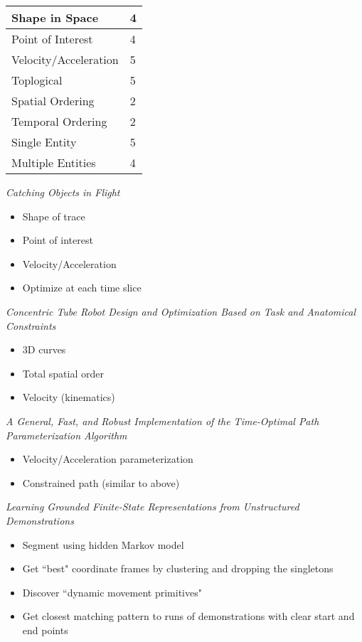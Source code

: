 \documentclass[12pt]{article}
\begin{document}
\begin{table}[h]
\begin{tabular}{|l|l|}
\hline
Shape in Space &  4\\ \hline
Point of Interest & 4  \\ \hline
Velocity/Acceleration & 5 \\ \hline
Toplogical & 5 \\ \hline
Spatial Ordering & 2 \\ \hline
Temporal Ordering & 2 \\ \hline
Single Entity & 5 \\ \hline
Multiple Entities & 4 \\ \hline
\end{tabular}
\end{table}

{\sl Catching Objects in Flight}
\cite{kim2014catching}
\begin{itemize}
  \item Shape of trace
  \item Point of interest
  \item Velocity/Acceleration
  \item Optimize at each time slice
\end{itemize}

{\sl Concentric Tube Robot Design and Optimization
Based on Task and Anatomical Constraints}
\cite{bergelesconcentric}
\begin{itemize}
  \item 3D curves
  \item Total spatial order
  \item Velocity (kinematics)
\end{itemize}

{\sl A General, Fast, and Robust Implementation of the
Time-Optimal Path Parameterization Algorithm}
\cite{pham2014general}
\begin{itemize}
  \item Velocity/Acceleration parameterization
  \item Constrained path (similar to above)
\end{itemize}

{\sl Learning Grounded Finite-State Representations
from Unstructured Demonstrations}
\cite{niekum2014learning}
\begin{itemize}
  \item Segment using hidden Markov model
  \item Get ``best" coordinate frames by clustering
        and dropping the singletons
  \item Discover ``dynamic movement primitives"
  \item Get closest matching pattern to runs of
        demonstrations with clear start and end points
\end{itemize}
\end{document}
